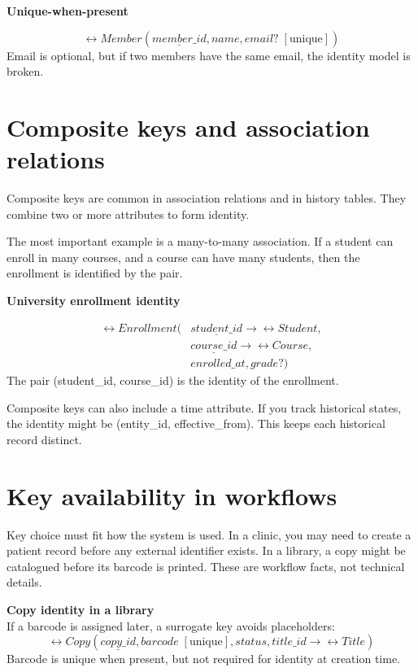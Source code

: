 \begin{examplebox}
\textbf{Unique-when-present}\par\smallskip
\[
\rel{Member}(\underline{member\_id}, name, email? \;[\text{unique}])
\]
Email is optional, but if two members have the same email, the identity model is broken.
\end{examplebox}

\section{Composite keys and association relations}
Composite keys are common in association relations and in history tables.
They combine two or more attributes to form identity.

The most important example is a many-to-many association.
If a student can enroll in many courses, and a course can have many students, then the enrollment is identified by the pair.

\begin{examplebox}
\textbf{University enrollment identity}\par\smallskip
\[
\begin{aligned}
\rel{Enrollment}(&\underline{student\_id} \rightarrow \rel{Student}, \\
&\underline{course\_id} \rightarrow \rel{Course}, \\
&enrolled\_at, grade?)
\end{aligned}
\]
The pair (student\_id, course\_id) is the identity of the enrollment.
\end{examplebox}

Composite keys can also include a time attribute.
If you track historical states, the identity might be (entity\_id, effective\_from).
This keeps each historical record distinct.

\section{Key availability in workflows}
Key choice must fit how the system is used.
In a clinic, you may need to create a patient record before any external identifier exists.
In a library, a copy might be catalogued before its barcode is printed.
These are workflow facts, not technical details.

\begin{examplebox}
\textbf{Copy identity in a library}\\
If a barcode is assigned later, a surrogate key avoids placeholders:
\[
\rel{Copy}(\underline{copy\_id}, barcode \;[\text{unique}], status, title\_id \rightarrow \rel{Title})
\]
Barcode is unique when present, but not required for identity at creation time.
\end{examplebox}

